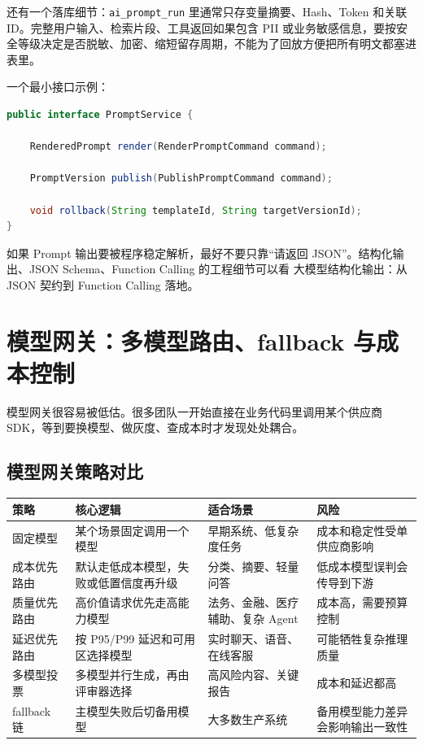 \documentclass[9pt,a4paper,twocolumn]{ctexart}
\begin{document}
还有一个落库细节：\texttt{ai\_prompt\_run} 里通常只存变量摘要、Hash、Token 和关联 ID。完整用户输入、检索片段、工具返回如果包含 PII 或业务敏感信息，要按安全等级决定是否脱敏、加密、缩短留存周期，不能为了回放方便把所有明文都塞进表里。



一个最小接口示例：



\begin{lstlisting}[language=Java]
public interface PromptService {

    RenderedPrompt render(RenderPromptCommand command);

    PromptVersion publish(PublishPromptCommand command);

    void rollback(String templateId, String targetVersionId);
}
\end{lstlisting}



如果 Prompt 输出要被程序稳定解析，最好不要只靠“请返回 JSON”。结构化输出、JSON Schema、Function Calling 的工程细节可以看 大模型结构化输出：从 JSON 契约到 Function Calling 落地。



\section*{模型网关：多模型路由、fallback 与成本控制}


模型网关很容易被低估。很多团队一开始直接在业务代码里调用某个供应商 SDK，等到要换模型、做灰度、查成本时才发现处处耦合。



\subsection*{模型网关策略对比}

{\footnotesize
\begin{tabular}{|p{}|p{}|p{}|p{}|}
\hline
\textbf{策略} & \textbf{核心逻辑} & \textbf{适合场景} & \textbf{风险} \\
\hline
固定模型 & 某个场景固定调用一个模型 & 早期系统、低复杂度任务 & 成本和稳定性受单供应商影响 \\
\hline
成本优先路由 & 默认走低成本模型，失败或低置信度再升级 & 分类、摘要、轻量问答 & 低成本模型误判会传导到下游 \\
\hline
质量优先路由 & 高价值请求优先走高能力模型 & 法务、金融、医疗辅助、复杂 Agent & 成本高，需要预算控制 \\
\hline
延迟优先路由 & 按 P95/P99 延迟和可用区选择模型 & 实时聊天、语音、在线客服 & 可能牺牲复杂推理质量 \\
\hline
多模型投票 & 多模型并行生成，再由评审器选择 & 高风险内容、关键报告 & 成本和延迟都高 \\
\hline
fallback 链 & 主模型失败后切备用模型 & 大多数生产系统 & 备用模型能力差异会影响输出一致性 \\
\hline
\end{tabular}
}
\end{document}
